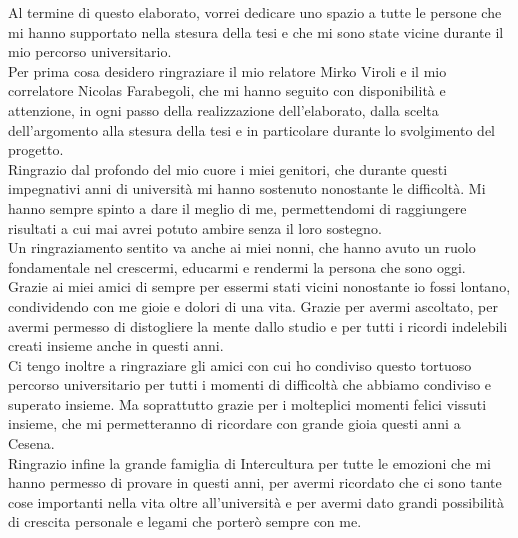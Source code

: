 \documentclass[12pt,a4paper,openright,twoside]{book}
\begin{document}

\backmatter




\begin{acknowledgements}
    Al termine di questo elaborato, vorrei dedicare uno spazio a tutte le persone che mi hanno supportato nella stesura della tesi e che mi sono state vicine 
    durante il mio percorso universitario.\\
    Per prima cosa desidero ringraziare il mio relatore Mirko Viroli e il mio correlatore Nicolas Farabegoli, che mi hanno seguito con disponibilità e attenzione,
    in ogni passo della realizzazione dell'elaborato, dalla scelta dell'argomento alla stesura della tesi e in particolare durante lo svolgimento del progetto.\\
    Ringrazio dal profondo del mio cuore i miei genitori, che durante questi impegnativi anni di università mi hanno sostenuto nonostante le difficoltà.
    Mi hanno sempre spinto a dare il meglio di me, permettendomi di raggiungere risultati a cui mai avrei potuto ambire senza il loro sostegno.\\
    Un ringraziamento sentito va anche ai miei nonni, che hanno avuto un ruolo fondamentale nel crescermi, educarmi e rendermi la persona che sono oggi.\\
    Grazie ai miei amici di sempre per essermi stati vicini nonostante io fossi lontano, condividendo con me gioie e dolori di una vita.
    Grazie per avermi ascoltato, per avermi permesso di distogliere la mente dallo studio e per tutti i ricordi indelebili creati insieme anche in questi anni.\\
    Ci tengo inoltre a ringraziare gli amici con cui ho condiviso questo tortuoso percorso universitario per tutti i momenti di difficoltà che abbiamo condiviso e superato insieme.
    Ma soprattutto grazie per i molteplici momenti felici vissuti insieme, che mi permetteranno di ricordare con grande gioia questi anni a Cesena.\\
    Ringrazio infine la grande famiglia di Intercultura per tutte le emozioni che mi hanno permesso di provare in questi anni, per avermi ricordato che ci sono tante cose 
    importanti nella vita oltre all'università e per avermi dato grandi possibilità di crescita personale e legami che porterò sempre con me.
\end{acknowledgements}
\end{document}

